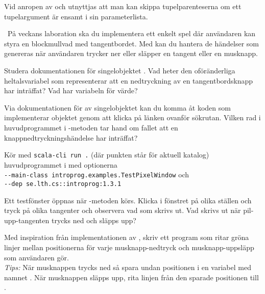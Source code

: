 \SubtaskSolved Vid anropen av  och  utnyttjas att man kan skippa tupelparenteserna om ett tupelargument är ensamt i sin parameterlista.



\QUESTEND




\QUESTBEGIN

\Task \what~På veckans laboration ska du implementera ett enkelt spel där användaren kan styra en blockmullvad med tangentbordet. Med  kan du hantera de händelser som genereras när användaren trycker ner eller släpper en tangent eller en musknapp.


\Subtask Studera dokumentationen för singelobjektet . Vad heter den oföränderliga heltalsvariabel som representerar att en nedtryckning av en tangentbordsknapp har inträffat? Vad har variabeln för värde?

\Subtask Via dokumentationen för av singelobjektet  kan du komma åt koden som implementerar objektet genom att klicka på länken  ovanför sökrutan. Vilken rad i huvudprogrammet i -metoden tar hand om fallet att en knappnedtryckningshändelse har inträffat?

\Subtask Kör med \texttt{scala-cli run .} (där punkten står för aktuell katalog) huvudprogrammet i  med optionerna\\
\texttt{-{}-main-class introprog.examples.TestPixelWindow} och \\
\texttt{-{}-dep se.lth.cs::introprog:1.3.1} 

Ett testfönster öppnas när -metoden körs. Klicka i fönstret på olika ställen och tryck på olika tangenter och observera vad som skrivs ut. Vad skrivs ut när pil-upp-tangenten trycks ned och släpps upp?

\Subtask Med inspiration från implementationen av , skriv ett program som ritar gröna linjer mellan positionerna för varje musknapp-nedtryck och musknapp-uppsläpp som användaren gör. \\\emph{Tips:} När musknappen trycks ned så spara undan positionen i en variabel med namnet . När musknappen släpps upp, rita linjen från den sparade positionen till .

\SOLUTION

\TaskSolved \what~

